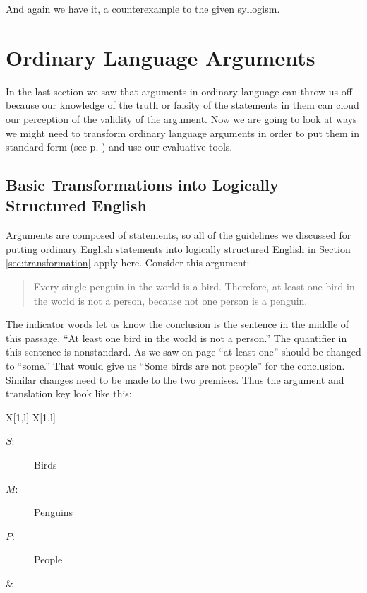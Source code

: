 \begin{kormanize}
 \end{kormanize}

And again we have it, a counterexample to the given syllogism.

\section{Ordinary Language Arguments}

In the last section we saw that arguments in ordinary language can throw us off because our knowledge of the truth or falsity of the statements in them can cloud our perception of the validity of the argument. Now we are going to look at ways we might need to transform ordinary language arguments in order to put them in standard form (see p. \pageref{standard_form}) and use our evaluative tools.

\subsection{Basic Transformations into Logically Structured English}

Arguments are composed of statements, so all of the guidelines we discussed for putting ordinary English statements into logically structured English in Section \ref{sec:transformation} apply here.
Consider this argument:

\begin{quotation}
\noindent Every single penguin in the world is a bird. Therefore, at least one bird in the world is not a person, because not one person is a penguin.
\end{quotation}

The indicator words let us know the conclusion is the sentence in the middle of this passage, ``At least one bird in the world is not a person.'' The quantifier in this sentence is nonstandard. As we saw on page \pageref{subsec:nonstandard_quantifiers} ``at least one'' should be changed to ``some.'' That would give us ``Some birds are not people'' for the conclusion. Similar changes need to be made to the two premises. Thus the argument and translation key look like this:

\begin{tabu}{{X[1,l] X[1,l]}}
\begin{description}
\item[$S$:] Birds
\item[$M$:] Penguins
\item[$P$:] People
\end{description}
&
\begin{kormanize}
\end{kormanize}
\end{tabu}

